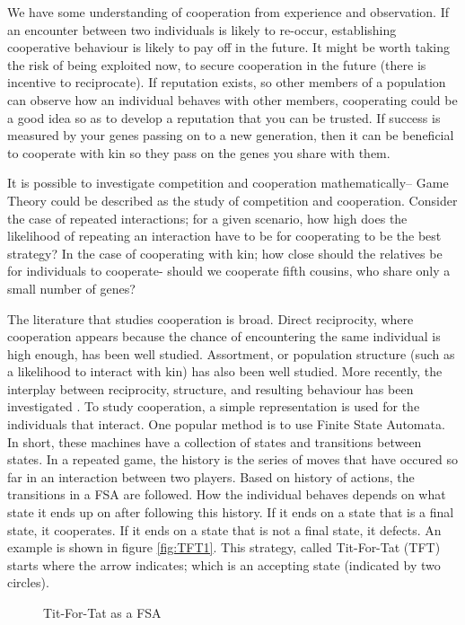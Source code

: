\documentclass[a4paper,11pt,bcshonoursthesis,singlespace,twoside,thesisdraft,pdflatex]{cssethesis}
\renewcommand{\cite}{\citep} %
\begin{document}
We have some understanding of cooperation from experience and observation. 
If an encounter between two individuals is likely to re-occur, establishing cooperative behaviour is likely to pay off in the future. 
It might be worth taking the risk of being exploited now, to secure cooperation in the future (there is incentive to reciprocate). 
If reputation exists, so other members of a population can observe how an individual behaves with other members, cooperating could be a good idea so as to develop a reputation that you can be trusted. 
If success is measured by your genes passing on to a new generation, then it can be beneficial to cooperate with kin so they pass on the genes you share with them. 

It is possible to investigate competition and cooperation mathematically-- Game Theory could be described as the study of competition and cooperation. 
Consider the case of repeated interactions; for a given scenario, how high does the likelihood of repeating an interaction have to be for cooperating to be the best strategy? 
In the case of cooperating with kin; how close should the relatives be for individuals to cooperate- should we cooperate fifth cousins, who share only a small number of genes? 

The literature that studies cooperation is broad. Direct reciprocity, where cooperation appears because the chance of encountering the same individual is high enough, has been well studied. 
Assortment, or population structure (such as a likelihood to interact with kin) has also been well studied. 
More recently, the interplay between reciprocity, structure, and resulting behaviour has been investigated \cite{van-veelen:PNAS:2012}. 
To study cooperation, a simple representation is used for the individuals that interact. One popular method is to use Finite State Automata. 
In short, these machines have a collection of states and transitions between states. 
In a repeated game, the history is the series of moves that have occured so far in an interaction between two players. 
Based on history of actions, the transitions in a FSA are followed. 
How the individual behaves depends on what state it ends up on after following this history. 
If it ends on a state that is a final state, it cooperates. If it ends on a state that is not a final state, it defects. An example is shown in figure \ref{fig:TFT1}. This strategy, called Tit-For-Tat (TFT) starts where the arrow indicates; which is an accepting state (indicated by two circles).

\begin{figure}
\centering
\label{fig:fsa.tft.lang}
\caption{Tit-For-Tat as a FSA}
\end{figure}
\end{document}
